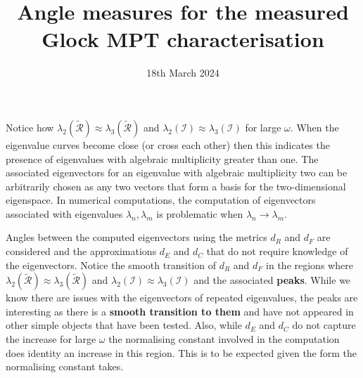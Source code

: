 \documentclass[a4paper,12]{article}
\theoremstyle{definition}
\begin{document}
\title{Angle measures for the measured Glock MPT characterisation}
\date{18th March 2024}
\maketitle
Notice how $\lambda_2(\tilde{\mathcal R})\approx \lambda_3(\tilde{\mathcal R})$ and $\lambda_2({\mathcal I})\approx \lambda_3({\mathcal I})$ for large $\omega$. When the eigenvalue curves become close (or cross each other) then this indicates the presence of eigenvalues with algebraic multiplicity greater than one.  The associated eigenvectors for an eigenvalue with algebraic multiplicity two 
 can be arbitrarily chosen as any two vectors that form a basis for the two-dimensional eigenspace. In numerical computations, the computation of eigenvectors associated with eigenvalues $\lambda_n , \lambda_m$ is problematic when $\lambda_n \to \lambda_m$. 

 Angles between the computed eigenvectors using the metrics $d_R$ and $d_F$ are considered and  the approximations $d_E$ and $d_C$ that do not require knowledge of the eigenvectors. Notice the smooth transition of   $d_R$ and $d_F$  in the regions where $\lambda_2(\tilde{\mathcal R})\approx \lambda_3(\tilde{\mathcal R})$ and $\lambda_2({\mathcal I})\approx \lambda_3({\mathcal I})$ and the associated {\bf peaks}.
While we know there are issues with the eigenvectors of repeated eigenvalues, the peaks are interesting as there is a {\bf smooth transition to them} and have not appeared in other simple objects that have been tested.
Also, while $d_E$ and $d_C$ do not capture the increase for large $\omega$ the normalising constant involved in the computation does identity an increase in this region. This is to be expected given the form the normalising constant  takes.
\end{document}
